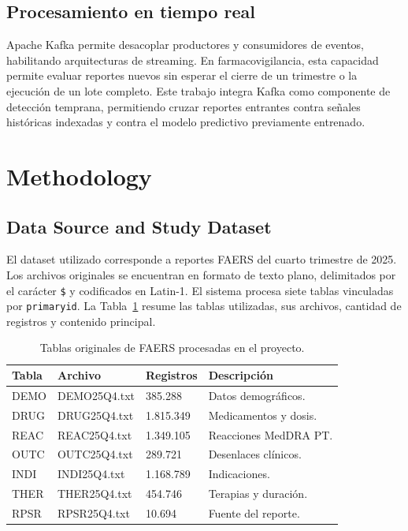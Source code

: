 \documentclass[12pt,a4paper]{article}
\begin{document}
\subsection{Procesamiento en tiempo real}
Apache Kafka permite desacoplar productores y consumidores de eventos, habilitando arquitecturas de streaming. En farmacovigilancia, esta capacidad permite evaluar reportes nuevos sin esperar el cierre de un trimestre o la ejecución de un lote completo. Este trabajo integra Kafka como componente de detección temprana, permitiendo cruzar reportes entrantes contra señales históricas indexadas y contra el modelo predictivo previamente entrenado.

\section{Methodology}

\subsection{Data Source and Study Dataset}
El dataset utilizado corresponde a reportes FAERS del cuarto trimestre de 2025. Los archivos originales se encuentran en formato de texto plano, delimitados por el carácter \texttt{\$} y codificados en Latin-1. El sistema procesa siete tablas vinculadas por \texttt{primaryid}. La Tabla~\ref{tab:faers_tables} resume las tablas utilizadas, sus archivos, cantidad de registros y contenido principal.

\begin{table}[H]
\centering
\caption{Tablas originales de FAERS procesadas en el proyecto.}
\label{tab:faers_tables}
\small
\begin{tabular}{@{}llll@{}}
\toprule
\textbf{Tabla} & \textbf{Archivo} & \textbf{Registros} & \textbf{Descripción} \\
\midrule
DEMO & DEMO25Q4.txt & 385.288 & Datos demográficos. \\
DRUG & DRUG25Q4.txt & 1.815.349 & Medicamentos y dosis. \\
REAC & REAC25Q4.txt & 1.349.105 & Reacciones MedDRA PT. \\
OUTC & OUTC25Q4.txt & 289.721 & Desenlaces clínicos. \\
INDI & INDI25Q4.txt & 1.168.789 & Indicaciones. \\
THER & THER25Q4.txt & 454.746 & Terapias y duración. \\
RPSR & RPSR25Q4.txt & 10.694 & Fuente del reporte. \\
\bottomrule
\end{tabular}
\end{table}
\end{document}
